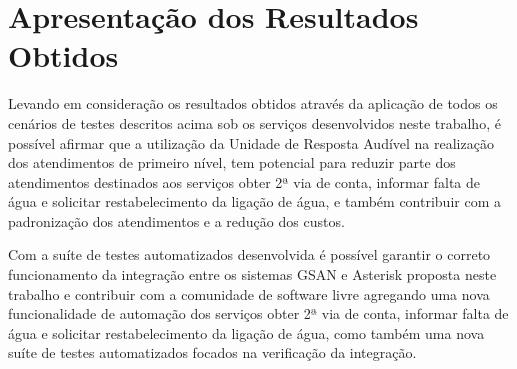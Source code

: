 \section{Apresentação dos Resultados Obtidos}

Levando em consideração os resultados obtidos através da aplicação de todos os cenários de testes descritos acima sob os serviços desenvolvidos neste trabalho, é possível afirmar que a utilização da Unidade de Resposta Audível na realização dos atendimentos de primeiro nível, tem potencial para reduzir parte dos atendimentos destinados aos serviços obter 2ª via de conta, informar falta de água e solicitar restabelecimento da ligação de água, e também contribuir com a padronização dos atendimentos e a redução dos custos.

Com a suíte de testes automatizados desenvolvida é possível garantir o correto funcionamento da integração entre os sistemas GSAN e Asterisk proposta neste trabalho e contribuir com a comunidade de software livre agregando uma nova funcionalidade de automação dos serviços obter 2ª via de conta, informar falta de água e solicitar restabelecimento da ligação de água, como também uma nova suíte de testes automatizados focados na verificação da integração.
 


